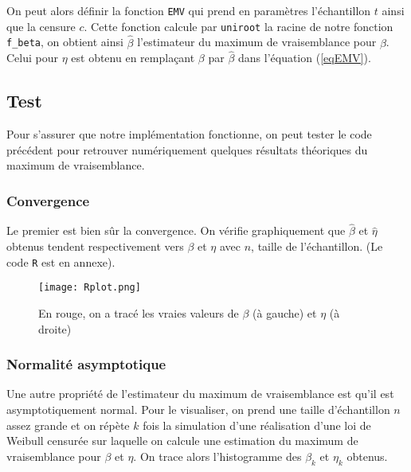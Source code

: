 \documentclass[a4paper]{report}
\begin{document}
 On peut alors définir la fonction \verb|EMV| qui prend en paramètres l'échantillon $t$ ainsi que la censure $c$. Cette fonction calcule par \verb|uniroot| la racine de notre fonction \verb|f_beta|, on obtient ainsi $\hat{\beta}$ l'estimateur du maximum de vraisemblance pour $\beta$. Celui pour $\eta$ est obtenu en remplaçant $\beta$ par $\hat{\beta}$ dans l'équation (\ref{eqEMV}). 


     
\subsection{Test}

Pour s'assurer que notre implémentation fonctionne, on peut tester le code précédent pour retrouver numériquement quelques résultats théoriques du maximum de vraisemblance.     
    
\subsubsection{Convergence}

Le premier est bien sûr la convergence. On vérifie graphiquement que $\hat{\beta}$ et $\hat{\eta}$ obtenus tendent respectivement vers $\beta$ et $\eta$ avec $n$, taille de l'échantillon. (Le code \verb|R| est en annexe).

 \begin{figure}[!ht]
	\centering
     	\texttt{[image: Rplot.png]}

	\caption{En rouge, on a tracé les vraies valeurs de $\beta$ (à gauche) et $\eta$ (à droite)}
\end{figure}

\subsubsection{Normalité asymptotique}

Une autre propriété de l'estimateur du maximum de vraisemblance est qu'il est asymptotiquement normal. Pour le visualiser, on prend une taille d'échantillon $n$ assez grande et on répète $k$ fois la simulation d'une réalisation d'une loi de Weibull censurée sur laquelle on calcule une estimation du maximum de vraisemblance pour $\beta$ et $\eta$. On trace alors l'histogramme des $\beta_k$ et $\eta_k$ obtenus. 
\end{document}
